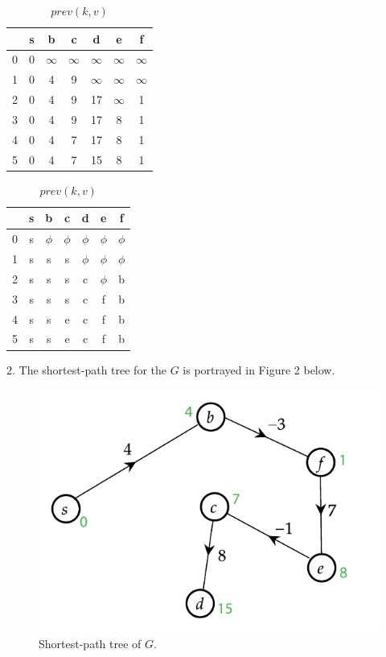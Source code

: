 \documentclass[tikz, letterpaper,12pt]{article}
\begin{document}
\begin{table}   
\parbox{.45\linewidth}{
\centering
        \begin{tabular}{c|c|c|c|c|c|c|}
              & s & b & c & d & e & f\\
            \hline 
            0 & 0 & $\infty$ & $\infty$ & $\infty$ & $\infty$ & $\infty$\\
            \hline 
            1 & 0 & 4 & 9 & $\infty$ & $\infty$ & $\infty$\\
            \hline 
            2 & 0 & 4 & 9 & 17 & $\infty$ & 1\\
            \hline 
            3 & 0 & 4 & 9 & 17 & 8 & 1\\
            \hline 
            4 & 0 & 4 & 7 & 17 & 8 & 1\\
            \hline 
            5 & 0 & 4 & 7 & 15 & 8 & 1\\
            \hline 
        \end{tabular}
    \caption{$dist(k, v)$}
}
\hfill      
\parbox{.45\linewidth}{
\centering
        \begin{tabular}{c|c|c|c|c|c|c|}
              & s & b & c & d & e & f\\
            \hline 
            0 & s & $\phi$ & $\phi$ & $\phi$ & $\phi$ & $\phi$\\
            \hline 
            1 & s & s & s & $\phi$ & $\phi$ & $\phi$\\
            \hline 
            2 & s & s & s & c & $\phi$ & b\\
            \hline 
            3 & s & s & s & c & f & b\\
            \hline 
            4 & s & s & e & c & f & b\\
            \hline 
            5 & s & s & e & c & f & b\\
            \hline 
        \end{tabular}
    \caption{$prev(k,v)$}
}
\end{table}

2. The shortest-path tree for the $G$ is portrayed in Figure 2 below.
\begin{figure}[H]
\centering
    \includegraphics[scale=1.3]{WA3/images/graph2.pdf}
    \caption{Shortest-path tree of $G$.}
\end{figure}
\end{document}
